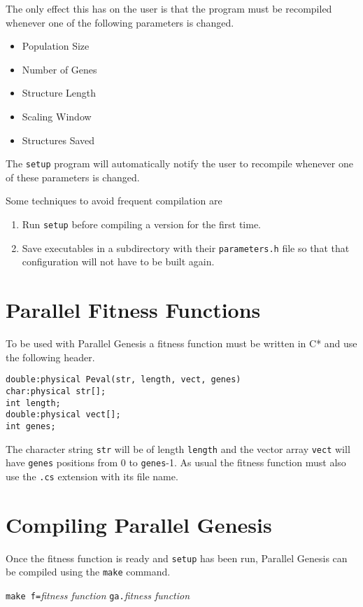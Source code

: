 The only effect this has on the user is that the program must be recompiled 
whenever one of the following parameters is changed.
\begin{itemize}
\item Population Size
\item Number of Genes
\item Structure Length
\item Scaling Window
\item Structures Saved
\end{itemize}
The {\tt setup} program will automatically notify the user to recompile
whenever one of these parameters is changed.

Some techniques to avoid frequent compilation are
\begin{enumerate}
\item Run {\tt setup} before compiling a version for the first time.
\item Save executables in a subdirectory with their {\tt parameters.h} file so
that that configuration will not have to be built again.
\end{enumerate}

\section{Parallel Fitness Functions}

To be used with Parallel Genesis a fitness function must be written in C* and
use the following header.

\begin{verbatim}
double:physical Peval(str, length, vect, genes)
char:physical str[];	
int length;	
double:physical vect[];
int genes;
\end{verbatim}

The character string {\tt str} will be of length {\tt length} and the vector
array {\tt vect} will have {\tt genes} positions from 0 to {\tt genes}-1.
As usual the fitness function must also use the {\tt .cs} extension with its
file name.

\section{Compiling Parallel Genesis}

Once the fitness function is ready and {\tt setup} has been run, Parallel 
Genesis can be compiled using the {\tt make} command.

{\tt make f=}{\it fitness function} {\tt ga.}{\it fitness function}

